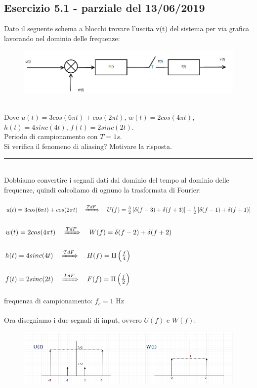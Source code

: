 \documentclass[12pt,a4paper]{article}
\begin{document}
	\subsection*{Esercizio 5.1 - parziale del 13/06/2019} Dato il seguente schema a blocchi trovare l’uscita v(t) del sistema per via grafica lavorando nel dominio delle frequenze:
	\begin{figure}[h!]
		\centering
		\includegraphics[scale=0.4]{./images/fourier51.png}
	\end{figure}
	\\Dove $u(t) = 3cos(6\pi t) + cos(2\pi t)$, $w(t) = 2cos(4\pi t)$, $h(t) = 4sinc(4t)$, $f(t) = 2sinc(2t)$.\\
	Periodo di campionamento con $T= 1s$. \\Si verifica il fenomeno di aliasing?  Motivare la risposta.
	\par\noindent\rule{\textwidth}{0.4pt}
	\vspace{5mm}
	\\
	Dobbiamo convertire i segnali dati dal dominio del tempo al dominio delle frequenze, quindi calcoliamo di ognuno la trasformata di Fourier:\\\\
	$u(t) = 3cos(6\pi t) + cos(2\pi t)\quad\xRightarrow[]{TdF}\quad U(f) = \frac{3}{2}\left[\delta(f-3) + \delta(f+3)\right] + \frac{1}{2}\left[\delta(f-1) + \delta(f+1)\right]$\\\\
	$w(t) = 2cos(4\pi t)\quad\xRightarrow[]{TdF}\quad W(f) = \delta(f-2) + \delta(f+2)$\\\\
	$h(t) = 4sinc(4t)\quad\xRightarrow[]{TdF}\quad H(f) = \Pi\left(\frac{f}{4}\right)$\\\\
	$f(t) = 2sinc(2t)\quad\xRightarrow[]{TdF}\quad F(f) = \Pi\left(\frac{f}{2}\right)$\\\\
	frequenza di campionamento: $f_c = 1$ Hz\\\\
	Ora disegniamo i due segnali di input, ovvero $U(f)$ e $W(f)$:
	\begin{figure}[h!]
		\centering
		\includegraphics[scale=0.6]{./images/fourier52.png}
	\end{figure}
\end{document}
